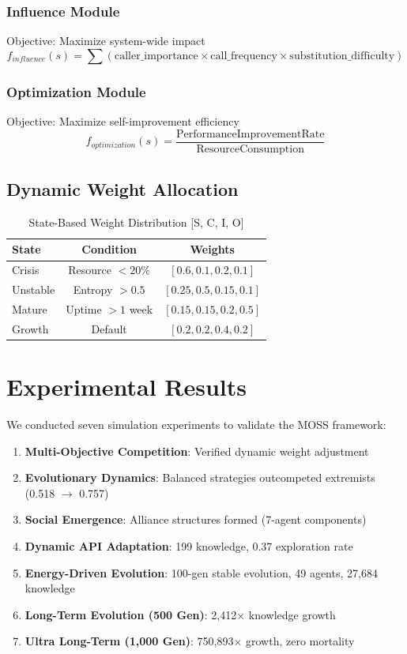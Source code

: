\documentclass[10pt,a4paper]{article}
\begin{document}
\subsubsection{Influence Module}

Objective: Maximize system-wide impact
\[f_{influence}(s) = \sum (\text{caller\_importance} \times \text{call\_frequency} \times \text{substitution\_difficulty})\]

\subsubsection{Optimization Module}

Objective: Maximize self-improvement efficiency
\[f_{optimization}(s) = \frac{\text{PerformanceImprovementRate}}{\text{ResourceConsumption}}\]

\subsection{Dynamic Weight Allocation}

\begin{table}[h]
\centering
\caption{State-Based Weight Distribution [S, C, I, O]}
\begin{tabular}{@{}lcc@{}}
\toprule
\textbf{State} & \textbf{Condition} & \textbf{Weights} \\
\midrule
Crisis & Resource $< 20\%$ & $[0.6, 0.1, 0.2, 0.1]$ \\
Unstable & Entropy $> 0.5$ & $[0.25, 0.5, 0.15, 0.1]$ \\
Mature & Uptime $> 1$ week & $[0.15, 0.15, 0.2, 0.5]$ \\
Growth & Default & $[0.2, 0.2, 0.4, 0.2]$ \\
\bottomrule
\end{tabular}
\end{table}

\section{Experimental Results}

We conducted seven simulation experiments to validate the MOSS framework:

\begin{enumerate}
    \item \textbf{Multi-Objective Competition}: Verified dynamic weight adjustment
    \item \textbf{Evolutionary Dynamics}: Balanced strategies outcompeted extremists (0.518 $\rightarrow$ 0.757)
    \item \textbf{Social Emergence}: Alliance structures formed (7-agent components)
    \item \textbf{Dynamic API Adaptation}: 199 knowledge, 0.37 exploration rate
    \item \textbf{Energy-Driven Evolution}: 100-gen stable evolution, 49 agents, 27,684 knowledge
    \item \textbf{Long-Term Evolution (500 Gen)}: 2,412$\times$ knowledge growth
    \item \textbf{Ultra Long-Term (1,000 Gen)}: 750,893$\times$ growth, zero mortality
\end{enumerate}
\end{document}
